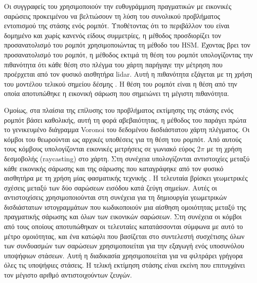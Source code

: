 Οι συγγραφείς του \cite{Zhu2011a} χρησιμοποιούν την ευθυγράμμιση πραγματικών με
εικονικές σαρώσεις προκειμένου να βελτιώσουν τη λύση του συνολικού προβλήματος
εντοπισμού της στάσης ενός ρομπότ. Υποθέτοντας ότι το περιβάλλον του
είναι δομημένο και χωρίς κανενός είδους συμμετρίες, η μέθοδος προσδιορίζει τον
προσανατολισμό του ρομπότ χρησιμοποιώντας τη μέθοδο του HSM. Έχοντας βρει τον
προσανατολισμό του ρομπότ, η μέθοδος εκτιμά τη θέση του ρομπότ υπολογίζοντας
την πιθανότητα ότι κάθε θέση στο πλέγμα του χάρτη παρήγαγε την μέτρηση που
προέρχεται από τον φυσικό αισθητήρα lidar. Αυτή η πιθανότητα εξάγεται με τη
χρήση του μοντέλου τελικού σημείου δέσμης \cite{thrun2005probabilistic}. Η θέση
του ρομπότ είναι η θέση από την οποία αποτυπώθηκε η εικονική σάρωση που
σημειώνει τη μέγιστη πιθανότητα.

Ομοίως, στα πλαίσια της επίλυσης του προβλήματος εκτίμησης της στάσης ενός
ρομπότ βάσει καθολικής, αυτή τη φορά αβεβαιότητας, η μέθοδος του
\cite{Park2014a} παράγει πρώτα το γενικευμένο διάγραμμα Voronoi του δεδομένου
δισδιάστατου χάρτη πλέγματος. Οι κόμβοι του θεωρούνται ως αρχικές υποθέσεις για
τη θέση του ρομπότ. Από αυτούς τους κόμβους υπολογίζονται εικονικές μετρήσεις
σε γωνιακό εύρος $2\pi$ με τη χρήση δεσμοβολής (raycasting) στο χάρτη. Στη
συνέχεια υπολογίζονται αντιστοιχίες μεταξύ κάθε εικονικής σάρωσης και της
σάρωσης που καταγράφηκε από τον φυσικό αισθητήρα με τη χρήση μίας φασματικής
τεχνικής \cite{Leordeanu2005a}. Η τελευταία βρίσκει γεωμετρικές σχέσεις μεταξύ
των δύο σαρώσεων εισόδου κατά ζεύγη σημείων. Αυτές οι αντιστοιχίσεις
χρησιμοποιούνται στη συνέχεια για τη δημιουργία γεωμετρικών δισδιάστατων
ιστογραμμάτων που κωδικοποιούν μια αίσθηση ομοιότητας μεταξύ της πραγματικής
σάρωσης και όλων των εικονικών σαρώσεων. Στη συνέχεια οι κόμβοι από τους
οποίους αποτυπώθηκαν οι τελευταίες κατατάσσονται σύμφωνα με αυτό το μέτρο
ομοιότητας, και ένα κατώφλι που βασίζεται στο συντελεστή συσχέτισης όλων των
συνδυασμών των σαρώσεων χρησιμοποιείται για την εξαγωγή ενός υποσυνόλου
υποψήφιων στάσεων. Αυτή η διαδικασία χρησιμοποιείται για να φιλτράρει γρήγορα
όλες τις υποψήφιες στάσεις. Η τελική εκτίμηση στάσης είναι εκείνη που
επιτυγχάνει τον μέγιστο αριθμό αντιστοιχούντων ζευγών.

